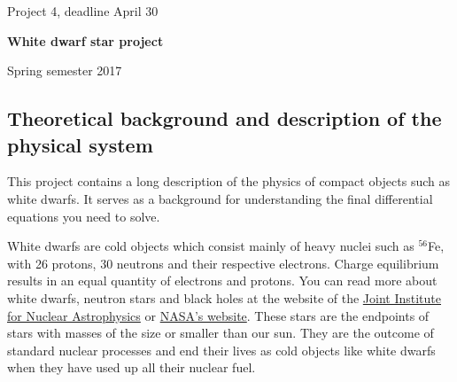 \documentclass[%
oneside,                 %
final,                   %
10pt]{article}
\begin{document}

\newcommand{\exercisesection}[1]{\subsection*{#1}}






\thispagestyle{empty}

\begin{center}
{\LARGE\bf
\begin{spacing}{1.25}
Project 4, deadline  April 30
\end{spacing}
}
\end{center}


\begin{center}
{\bf White dwarf star  project${}^{}$} \\ [0mm]
\end{center}

\begin{center}
\end{center}
    

\begin{center}
Spring semester 2017
\end{center}

\vspace{1cm}


\subsection{Theoretical background and description of the physical system}

This project contains a long description of the physics of compact objects such as white dwarfs.
It serves as a background for understanding the final differential equations you need to solve.

White dwarfs are cold objects which consist mainly of heavy nuclei such as $^{56}$Fe, with 26 protons, 30 neutrons
and  their respective electrons.  Charge equilibrium results in an equal quantity of electrons and protons.
You can read more about white dwarfs, neutron stars and black holes at the website of the
\href{{http://www.jinaweb.org}}{Joint Institute for Nuclear Astrophysics} or \href{{http://www.nasa.org}}{NASA's website}.
These stars are the endpoints of stars with masses of the size or smaller than our sun. 
They are the outcome of standard nuclear processes and end their lives as 
cold objects like white dwarfs when they have used up all their nuclear fuel.
\end{document}
